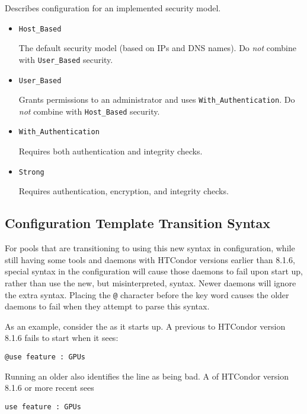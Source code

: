 \begin{description}
\label{usecategory:SECURITY}
\item[\MacroNI{SECURITY category}]
  Describes configuration for an implemented security model.
  \begin{itemize}
    \item \texttt{Host\_Based}

    The default security model (based on IPs and DNS names).
    Do \emph{not} combine with \texttt{User\_Based} security.

    \item \texttt{User\_Based}

    Grants permissions to an administrator and uses 
    \texttt{With\_Authentication}.
    Do \emph{not} combine with \texttt{Host\_Based} security.

    \item \texttt{With\_Authentication}

    Requires both authentication and integrity checks.

    \item \texttt{Strong}

    Requires authentication, encryption, and integrity checks.
  \end{itemize}

\end{description}

\subsection{\label{sec:Config-Template-Transition-Syntax}Configuration
Template Transition Syntax}

For pools that are transitioning to using this new syntax in configuration,
while still having some tools and daemons with HTCondor versions 
earlier than 8.1.6,
special syntax in the configuration will cause those daemons to
fail upon start up,
rather than use the new, but misinterpreted, syntax. 
Newer daemons will ignore the extra syntax.
Placing the \verb|@| character before the  key word
causes the older daemons to fail when they attempt to
parse this syntax.

As an example, consider the  as it starts up.
A  previous to HTCondor version 8.1.6 fails to start
when it sees:
\begin{verbatim}
@use feature : GPUs
\end{verbatim}
Running an older  also identifies the 
line as being bad.
A  of HTCondor version 8.1.6 or more recent sees
\begin{verbatim}
use feature : GPUs
\end{verbatim}

